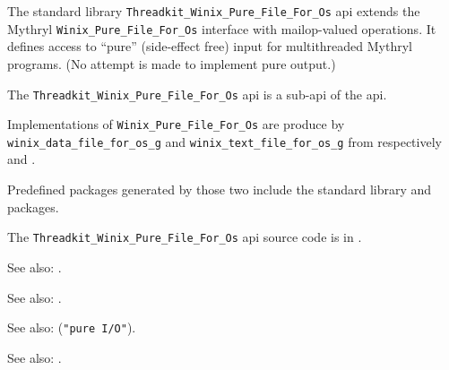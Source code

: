 
The standard library {\tt Threadkit\_Winix\_Pure\_File\_For\_Os} api extends the Mythryl {\tt Winix\_Pure\_File\_For\_Os} interface with mailop-valued operations.
It defines access to ``pure'' (side-effect free) input for multithreaded Mythryl programs. 
(No attempt is made to implement pure output.)

The {\tt Threadkit\_Winix\_Pure\_File\_For\_Os} api is a sub-api of the  api.

Implementations of {\tt Winix\_Pure\_File\_For\_Os} are produce by 
{\tt winix\_data\_file\_for\_os\_g} and {\tt winix\_text\_file\_for\_os\_g} from respectively 
 and 
.

Predefined packages generated by those two include the standard library  and 
 packages.

The {\tt Threadkit\_Winix\_Pure\_File\_For\_Os} api source code is in .

See also: .

See also: .

See also:  ({\tt "pure I/O"}).

See also: .
